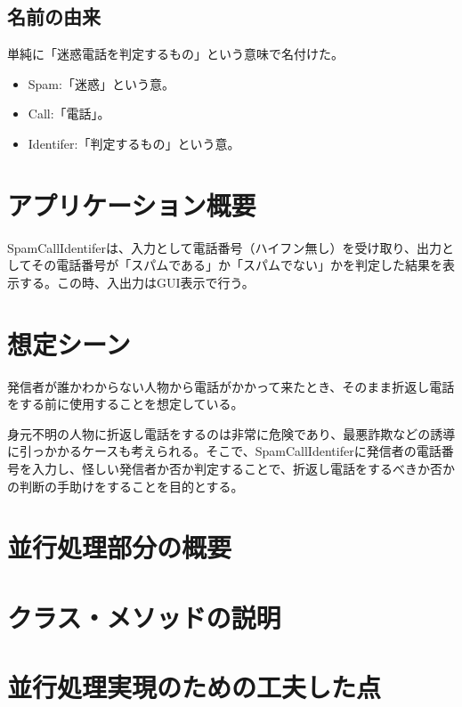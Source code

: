 \documentclass[dvipdfmx, titlepage]{jsarticle}
\begin{document}
\subsection{名前の由来}
単純に「迷惑電話を判定するもの」という意味で名付けた。
\begin{itemize}
  \item Spam:「迷惑」という意。
  \item Call:「電話」。
  \item Identifer:「判定するもの」という意。
\end{itemize}
\section{アプリケーション概要}
SpamCallIdentiferは、入力として電話番号（ハイフン無し）を受け取り、出力としてその電話番号が「スパムである」か「スパムでない」かを判定した結果を表示する。この時、入出力はGUI表示で行う。
\section{想定シーン}
発信者が誰かわからない人物から電話がかかって来たとき、そのまま折返し電話をする前に使用することを想定している。\par
身元不明の人物に折返し電話をするのは非常に危険であり、最悪詐欺などの誘導に引っかかるケースも考えられる。そこで、SpamCallIdentiferに発信者の電話番号を入力し、怪しい発信者か否か判定することで、折返し電話をするべきか否かの判断の手助けをすることを目的とする。
\section{並行処理部分の概要}
\section{クラス・メソッドの説明}
\section{並行処理実現のための工夫した点}
\end{document}
